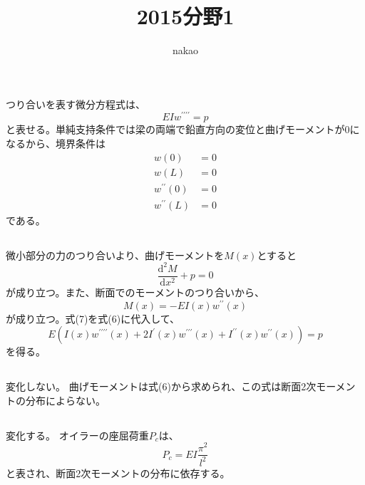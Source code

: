 \documentclass[a4paper]{jsarticle}
\begin{document}
\title{2015分野1}
\author{nakao}
\maketitle

\section{}
\subsection{}
つり合いを表す微分方程式は、
\begin{equation}
  E I w^{\prime \prime \prime \prime} = p
\end{equation}
と表せる。単純支持条件では梁の両端で鉛直方向の変位と曲げモーメントが0になるから、境界条件は
\begin{align}
  w(0) &= 0 \\
  w(L) &= 0 \\
  w^{\prime \prime}(0) &= 0 \\
  w^{\prime \prime}(L) &= 0
\end{align}
である。

\subsection{}
微小部分の力のつり合いより、曲げモーメントを$M(x)$とすると
\begin{equation}
  \frac{\mathrm{d}^2 M}{\mathrm{d} x^2} + p = 0
\end{equation}
が成り立つ。また、断面でのモーメントのつり合いから、
\begin{equation}
  M(x) = -E I(x) w^{\prime \prime}(x)
\end{equation}
が成り立つ。式(7)を式(6)に代入して、
\begin{equation}
  E \left(I(x) w^{\prime \prime \prime \prime}(x) + 
  2 I^{\prime}(x) w^{\prime \prime \prime}(x) + 
  I^{\prime \prime}(x) w^{\prime \prime}(x)\right)
  = p
\end{equation}
を得る。

\subsection{}
変化しない。
曲げモーメントは式(6)から求められ、この式は断面2次モーメントの分布によらない。

\subsection{}
変化する。
オイラーの座屈荷重$P_c$は、
\begin{equation}
  P_c = E I \frac{\pi^2}{l^2}
\end{equation}
と表され、断面2次モーメントの分布に依存する。
\end{document}
